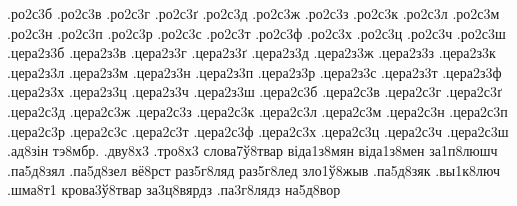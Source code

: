 {.ро2с3б
.ро2с3в
.ро2с3г
.ро2с3ґ
.ро2с3д
.ро2с3ж
.ро2с3з
.ро2с3к
.ро2с3л
.ро2с3м
.ро2с3н
.ро2с3п
.ро2с3р
.ро2с3с
.ро2с3т
.ро2с3ф
.ро2с3х
.ро2с3ц
.ро2с3ч
.ро2с3ш
.цера2з3б
.цера2з3в
.цера2з3г
.цера2з3ґ
.цера2з3д
.цера2з3ж
.цера2з3з
.цера2з3к
.цера2з3л
.цера2з3м
.цера2з3н
.цера2з3п
.цера2з3р
.цера2з3с
.цера2з3т
.цера2з3ф
.цера2з3х
.цера2з3ц
.цера2з3ч
.цера2з3ш
.цера2с3б
.цера2с3в
.цера2с3г
.цера2с3ґ
.цера2с3д
.цера2с3ж
.цера2с3з
.цера2с3к
.цера2с3л
.цера2с3м
.цера2с3н
.цера2с3п
.цера2с3р
.цера2с3с
.цера2с3т
.цера2с3ф
.цера2с3х
.цера2с3ц
.цера2с3ч
.цера2с3ш
.ад8зін
тэ8мбр.
.дву8х3
.тро8х3
слова7ў8твар
віда1з8мян
віда1з8мен
за1п8люшч
.па5д8зял
.па5д8зел
вё8рст
раз5г8ляд
раз5г8лед
зло1ў8жыв
.па5д8зяк
.вы1к8люч
.шма8т1
крова3ў8твар
за3ц8вярдз
.па3г8лядз
на5д8вор
}

